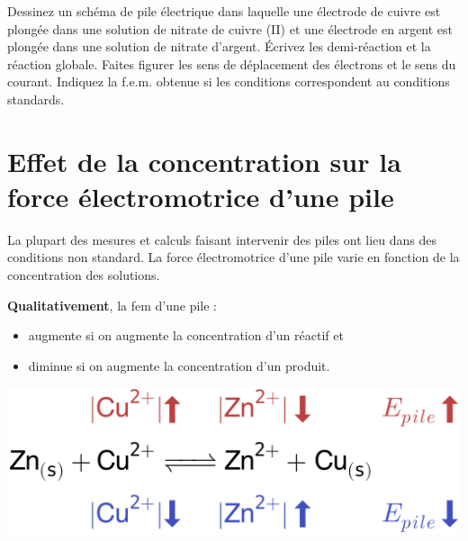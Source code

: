 \documentclass[
  11pt,
  a4paper,
  openany]{book}
\providecommand{\tightlist}{%
  \setlength{\itemsep}{0pt}\setlength{\parskip}{0pt}}
\begin{document}
\begin{Exercise}

Dessinez un schéma de pile électrique dans laquelle une électrode de cuivre est plongée dans une solution de nitrate de cuivre (II) et une électrode en argent est plongée dans une solution de nitrate d'argent. Écrivez les demi-réaction et la réaction globale. Faites figurer les sens de déplacement des électrons et le sens du courant. Indiquez la f.e.m. obtenue si les conditions correspondent au conditions standards.


\end{Exercise}

\clearpage

\hypertarget{effet-de-la-concentration-sur-la-force-uxe9lectromotrice-dune-pile}{%
\section{Effet de la concentration sur la force électromotrice d'une pile}\label{effet-de-la-concentration-sur-la-force-uxe9lectromotrice-dune-pile}}

La plupart des mesures et calculs faisant intervenir des piles ont lieu dans des conditions non standard. La force électromotrice d'une pile varie en fonction de la concentration des solutions.

\textbf{Qualitativement}, la fem d'une pile :

\begin{itemize}
\tightlist
\item
  augmente si on augmente la concentration d'un réactif et
\item
  diminue si on augmente la concentration d'un produit.
\end{itemize}

\begin{center}\includegraphics[width=0.5\linewidth]{images/nernst-illustration} \end{center}
\end{document}
